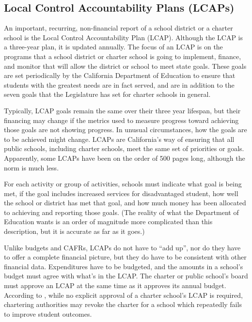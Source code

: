 \subsection{Local Control Accountability Plans (LCAPs)}\label{sec:lcaps}%

An important, recurring, non-financial report of a school district or a charter school is the Local Control Accountability Plan (LCAP).
 Although the LCAP is a three-year plan, it is updated annually. The focus of an LCAP is on the programs that a school district or charter school is going to implement, finance, and monitor that will allow the district or school to meet state goals. These goals are set periodically by the California Department of Education to ensure that students with the greatest needs are in fact served, and are in addition to the seven goals that the Legislature has set for charter schools in general.

Typically, LCAP goals remain the same over their three year lifespan, but their financing may change if the metrics used to measure progress toward achieving those goals are not showing progress. In unusual circumstances, how the goals are to be achieved might change. LCAPs are California's way of ensuring that all public schools, including charter schools, meet the same set of priorities or goals. Apparently, some LCAPs have been on the order of 500 pages long, although the norm is much less.

For each activity or group of activities, schools must indicate what goal is being met, if the goal includes increased services for disadvantaged student, how well the school or district has met that goal, and how much money has been allocated to achieving and reporting those goals. (The reality of what the Department of Education wants is an order of magnitude more complicated than this description, but it is accurate as far as it goes.)

Unlike budgets and CAFRs, LCAPs do not have to ``add up'', nor do they have to offer a complete financial picture, but they do have to be consistent with other financial data. Expenditures have to be budgeted, and the amounts in a school's budget must agree with what's in the LCAP\@. The charter or public school's board must approve an LCAP at the same time as it approves its annual budget. According to \textcite[81]{Aguinaldo.etal2022}, while no explicit approval of a charter school's LCAP is required, chartering authorities may revoke the charter for a school which repeatedly fails to improve student outcomes.

